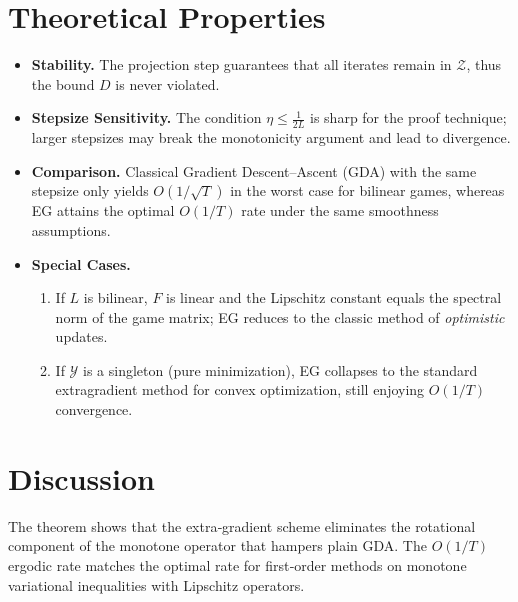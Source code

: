 \documentclass{article}
\begin{document}
\section*{Theoretical Properties}
\begin{itemize}
\item \textbf{Stability.} The projection step guarantees that all iterates remain in $\mathcal{Z}$, thus the bound $D$ is never violated.
\item \textbf{Stepsize Sensitivity.} The condition $\eta\le\frac{1}{2L}$ is sharp for the proof technique; larger stepsizes may break the monotonicity argument and lead to divergence.
\item \textbf{Comparison.} Classical Gradient Descent–Ascent (GDA) with the same stepsize only yields $O(1/\sqrt{T})$ in the worst case for bilinear games, whereas EG attains the optimal $O(1/T)$ rate under the same smoothness assumptions.
\item \textbf{Special Cases.}
    \begin{enumerate}[label=\alph*)]
    \item If $L$ is bilinear, $F$ is linear and the Lipschitz constant equals the spectral norm of the game matrix; EG reduces to the classic method of \emph{optimistic} updates.
    \item If $\mathcal{Y}$ is a singleton (pure minimization), EG collapses to the standard extragradient method for convex optimization, still enjoying $O(1/T)$ convergence.
    \end{enumerate}
\end{itemize}

\section*{Discussion}
The theorem shows that the extra‑gradient scheme eliminates the rotational component of the monotone operator that hampers plain GDA. The $O(1/T)$ ergodic rate matches the optimal rate for first‑order methods on monotone variational inequalities with Lipschitz operators.

\newpage
\end{document}
